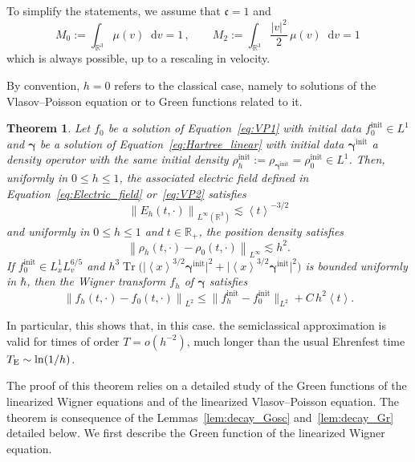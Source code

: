 \documentclass[a4paper,12pt]{amsart} %
\theoremstyle{plain}
\newtheorem{thm}{Theorem}[section]
\theoremstyle{definition}
\newcommand		{\RR}		{\mathbb R}			%
\newcommand		{\R}		{\RR}
\newcommand		{\Rd}		{\R^3}
\newcommand		{\hd}		{h^3}
\newcommand		{\lt}			{\left}				%
\newcommand		{\rt}			{\right}			%
\renewcommand	{\(}			{\lt(}
\renewcommand	{\)}			{\rt)}
\newcommand		{\set}[1]		{\lt\{#1\rt\}}
\newcommand		{\bangle}[1]	{\lt\langle #1\rt\rangle}
\newcommand		{\weight}[1]	{\bangle{#1}}	%
\newcommand		{\n}[1]			{\lt\lvert{#1}\rt\rvert}	%
\newcommand		{\sabs}[1]		{\lvert{#1}\rvert}
\newcommand		{\nrm}[1]		{\lt\lVert{#1}\rt\rVert}		%
\newcommand		{\snrm}[1]		{\lVert #1\rVert}
\newcommand		{\Nrm}[2]		{\nrm{#1}_{#2}}
\newcommand		{\sNrm}[2]		{\snrm{#1}_{#2}}
\renewcommand		{\d}		{\mathop{}\!\mathrm{d}}		%
\DeclareMathOperator{\tr}		{Tr}				%
\newcommand		{\intd}			{\int_{\Rd}}
\newcommand		{\init}			{\mathrm{init}}
\newcommand	{\h}			{h}
\newcommand		{\opgam}		{{\boldsymbol{\gamma}}}
\newcommand		{\op}			{\opgam}	%
\newcommand		{\CK}			{\mathfrak{c}}	%
\begin{document}
	To simplify the statements, we assume that $\CK = 1$ and
	\begin{equation*}
		M_0 := \intd \mu(v) \d v = 1\,,
		\qquad
		M_2 := \intd \frac{\n{v}^2}{2} \,\mu(v) \d v = 1 \, 
	\end{equation*}
	which is always possible, up to a rescaling in velocity.
	
	By convention, $h = 0$ refers to the classical case, namely to solutions of the Vlasov--Poisson equation or to Green functions related to it.

	\begin{thm}\label{thm:simplified}
		Let $f_0$ be a solution of Equation~\eqref{eq:VP1} with initial data $f_0^\init \in L^1$ and $\op$ be a solution of Equation~\eqref{eq:Hartree_linear} with initial data $\op^\init$ a density operator with the same initial density $\rho_\h^\init := \rho_{\op^\init} = \rho_0^\init \in L^1$. Then, uniformly in $0 \le h \le 1$, the associated electric field defined in Equation~\eqref{eq:Electric_field} or~\eqref{eq:VP2} satisfies
		\begin{equation}\label{eq:decay_E}
			\Nrm{E_\h(t,\cdot)}{L^\infty(\Rd)} \lesssim \weight{t}^{-3/2}
		\end{equation}
		and uniformly in $0 \le h \le 1$ and $t\in\R_+$, the position density satisfies
		\begin{equation}\label{eq:limit_rho}
			\Nrm{\rho_\h(t,\cdot) - \rho_0(t,\cdot)}{L^\infty} \lesssim h^2.
		\end{equation}
		If $f_0^\init \in L^1_xL^{6/5}_v$ and $\hd \tr\bigl(\sabs{\weight{x}^{3/2}\op^\init}^2+\sabs{\weight{x}^{3/2}\op^\init}^2\bigr)$ is bounded uniformly in $\hbar$, then the Wigner transform $f_\h$ of $\op$ satisfies
		\begin{equation}\label{eq:limit_f}
			\Nrm{f_\h(t,\cdot) - f_0(t,\cdot)}{L^2} \leq 
			\sNrm{f_\h^\init - f_0^\init}{L^2} + C\, h^2 \weight{t} .
		\end{equation}
	\end{thm}

	In particular, this shows that, in this case. the semiclassical approximation is valid for times of order $T = o(\h^{-2})$, much longer than the usual Ehrenfest time $T_\textnormal{E} \sim \ln(1/\h)$. 
	
	The proof of this theorem relies on a detailed study of the Green functions of the linearized Wigner equations and of the linearized Vlasov--Poisson equation. The theorem is consequence of the Lemmas~\ref{lem:decay_Gosc} and~\ref{lem:decay_Gr} detailed below. We first describe the Green function of the linearized Wigner equation.
\end{document}
